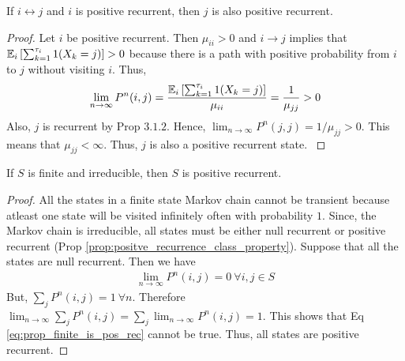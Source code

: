 \documentclass[all-lectures.tex]{subfiles}
\begin{document}
\begin{prop} \label{prop:positve_recurrence_class_property}
If $i\leftrightarrow j$ and $i$ is positive recurrent, then $j$ is also positive recurrent. 
\begin{proof}
Let $i$ be positive recurrent. Then $\mu_{ii} > 0$ and $i\rightarrow j$ implies that $\mathbb{E}_i\left[\sum_{k=1}^{\tau_i} 1(X_k=j)\right] > 0$ because there is a path with positive probability from $i$ to $j$ without visiting $i$. Thus, 
\begin{align*}
\lim_{n\rightarrow \infty} P^n(i,j) = \frac{\mathbb{E}_i\left[\sum_{k=1}^{\tau_i} 1(X_k=j)\right]}{\mu_{ii}} = \frac{1}{\mu_{jj}}>0
\end{align*}
{\color{red}Also, $j$ is recurrent by Prop $3.1.2$. Hence, $\lim_{n\rightarrow \infty} P^n(j,j) = 1/\mu_{jj} > 0$. This means that $\mu_{jj} < \infty$. Thus, $j$ is also a positive recurrent state. }
\end{proof}
\end{prop}

\begin{prop}
If $S$ is finite and irreducible, then $S$ is positive recurrent. 
\begin{proof}
All the states in a finite state Markov chain cannot be transient because atleast one state will be visited infinitely often with probability $1$. Since, the Markov chain is irreducible, all states must be either null recurrent or positive recurrent (Prop \ref{prop:positve_recurrence_class_property}). Suppose that all the states are null recurrent. Then we have
\begin{align} \label{eq:prop_finite_is_pos_rec}
\lim_{n\rightarrow \infty} P^n(i,j) = 0 \ \forall i,j \in S
\end{align} 
But, $\sum_j P^n(i,j) = 1\ \forall n$. Therefore $\lim_{n \rightarrow \infty} \sum_j P^n(i,j) = \sum_j \lim_{n \rightarrow \infty}  P^n(i,j) = 1$. This shows that Eq \ref{eq:prop_finite_is_pos_rec} cannot be true. Thus, all states are positive recurrent.
\end{proof}
\end{prop}
\end{document}
